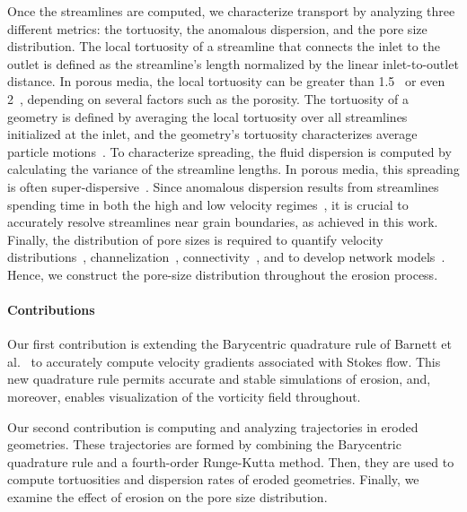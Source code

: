 \documentclass[preprint,10pt]{elsarticle}
\begin{document}
Once the streamlines are computed, we characterize transport by
analyzing three different metrics: the tortuosity, the anomalous
dispersion, and the pore size distribution.  The local tortuosity of a
streamline that connects the inlet to the outlet is defined as the
streamline's length normalized by the linear inlet-to-outlet distance.
In porous media, the local tortuosity can be greater than
1.5~\cite{kop-kat-tim1996, mat-kha-koz2008} or even
2~\cite{dud-koz-mat2011}, depending on several factors such as the
porosity. The tortuosity of a geometry is defined by averaging the local
tortuosity over all streamlines initialized at the inlet, and the
geometry's tortuosity characterizes average particle
motions~\cite{hak-com-den2019}.  To characterize spreading, the fluid
dispersion is computed by calculating the variance of the streamline
lengths. In porous media, this spreading is often
super-dispersive~\cite{kan-dea-nun-bij-blu-jua2014, cus-hu-den1995,
dea-leb-den-tar-bol-dav2013}. Since anomalous dispersion results from
streamlines spending time in both the high and low velocity
regimes~\cite{ber-sch2001}, it is crucial to accurately resolve
streamlines near grain boundaries, as achieved in this work.  Finally,
the distribution of pore sizes is required to quantify velocity
distributions~\cite{ali-par-wei-bre2017, dea-qua-bir-jua2018},
channelization~\cite{sie-ili-pri-riv-gua2019},
connectivity~\cite{knu-car2005, wes-blo-gra2001}, and to develop network
models~\cite{bry-kin-mel1993, bry-mel-cad1993, bij-blu2006}. Hence, we
construct the pore-size distribution throughout the erosion process.

\paragraph{Contributions}
Our first contribution is extending the Barycentric quadrature rule of
Barnett et al.~\cite{bar-wu-vee2015} to accurately compute velocity
gradients associated with Stokes flow. This new quadrature rule permits
accurate and stable simulations of erosion, and, moreover, enables
visualization of the vorticity field throughout.

Our second contribution is computing and analyzing trajectories in
eroded geometries.  These trajectories are formed by combining the
Barycentric quadrature rule and a fourth-order Runge-Kutta method. Then,
they are used to compute tortuosities and dispersion rates of eroded
geometries. Finally, we examine the effect of erosion on the pore size
distribution.
\end{document}
